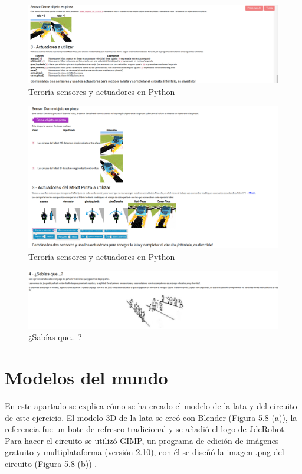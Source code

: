 \begin{figure}[H]
    \centering
    \includegraphics[width=1\textwidth, height=0.4\textwidth]{chapters/images/teoriag4python.png}
    \caption{Teroría sensores y actuadores en Python}
    \label{fig:my_label}
\end{figure}
\begin{figure}[H]
    \centering
    \includegraphics[width=1\textwidth, height=0.4\textwidth]{chapters/images/teoriag4scratch.png}
    \caption{Teroría sensores y actuadores en Python}
    \label{fig:my_label}
\end{figure}
\begin{figure}[H]
    \centering
    \includegraphics[width=1 \textwidth, height=0.27\textwidth]{chapters/images/teoriag5.png}
    \caption{¿Sabías que.. ?}
    \label{fig:my_label}
\end{figure}

\section{Modelos del mundo}
En este apartado se explica cómo se ha creado el modelo de la lata y del circuito de este ejercicio.
El modelo 3D de la lata se creó con Blender (Figura 5.8 (a)), la referencia fue un bote de refresco tradicional y se añadió el logo de JdeRobot. Para hacer el circuito  se utilizó  GIMP, un programa de edición de imágenes gratuito y multiplataforma (versión 2.10), con él se diseñó la imagen .png del circuito (Figura 5.8 (b)) .
 
